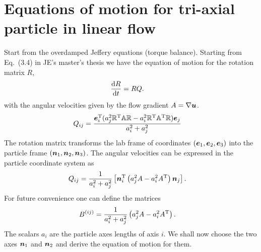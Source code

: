 \documentclass[thesis.tex]{subfiles}
\begin{document}
\chapter{Equations of motion for tri-axial particle in linear flow}

Start from the overdamped Jeffery equations (torque balance). Starting from Eq.~(3.4) in JE's master's thesis we have the equation of motion for the rotation matrix $R$,
\begin{align*}
	\frac{\mathrm{d} R}{\mathrm{d} t} &= RQ.
\end{align*}
with the angular velocities given by the flow gradient $A=\nabla \mbox{\boldmath$u$}$.
\begin{align*}
Q_{ij} &= \frac{\mbox{\boldmath$e$}_i^{\mathrm T}(a_j^2\mathbb{R}^{\mathrm T} \mathbb{A}\mathbb{R}  - a_i^2 \mathbb{R}^{\mathrm T} \mathbb{A}^{\mathrm T} \mathbb{R})\mbox{\boldmath$e$}_j}{a_i^2 + a_j^2}
\end{align*}
The rotation matrix transforms the lab frame of coordinates $(\mbox{\boldmath$e$}_1, \mbox{\boldmath$e$}_2, \mbox{\boldmath$e$}_3)$ into the particle frame $(\mbox{\boldmath$n$}_1, \mbox{\boldmath$n$}_2, \mbox{\boldmath$n$}_3)$. The angular velocities can be expressed in the particle coordinate system as
\begin{align*}
	Q_{ij} &= \frac{1}{a_i^2 + a_j^2}\left[\mbox{\boldmath$n$}_i^{\mathrm T}\left(a_j^2 A - a_i^2 A^{\mathrm T}\right)\mbox{\boldmath$n$}_j\right].
\end{align*}
For future convenience one can define the matrices
\begin{align*}
	B^{(ij)} &= \frac{1}{a_i^2 + a_j^2}\left(a_j^2 A - a_i^2 A^{\mathrm T}\right).
\end{align*}
The scalars $a_i$ are the particle axes lengths of axis $i$. We shall now choose the two axes $\mbox{\boldmath$n$}_1$ and $\mbox{\boldmath$n$}_2$ and derive the equation of motion for them.
\end{document}

